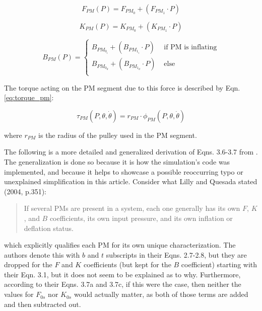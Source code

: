 \documentclass[conference]{IEEEtran}
\begin{document}
	\begin{equation}\label{eq:F_pm}
		F_{PM}(P) = F_{PM_{0}} + (F_{PM_{1}} \cdot P)
	\end{equation}
	
	\begin{equation}\label{eq:K_pm}
		K_{PM}(P) = K_{PM_{0}} + (K_{PM_{1}} \cdot P)
	\end{equation}
	
	\begin{equation}\label{eq:B_pm}
		B_{PM}(P) = \left\{
		\begin{aligned}
			B_{PM_{0_{i}}} + (B_{PM_{1_{i}}} \cdot P) & \text{  if PM is inflating} \\
			B_{PM_{0_{d}}} + (B_{PM_{1_{d}}} \cdot P) & \text{  else} \\
		\end{aligned}
		\right.
	\end{equation}

	The torque acting on the \ac{PM} segment due to this force is described by Eqn. \eqref{eq:torque_pm}:

	\begin{equation}\label{eq:torque_pm}
		\tau_{PM}(P, \theta, \dot{\theta}) = r_{PM} \cdot \phi_{PM}(P, \theta, \dot{\theta})
	\end{equation}

	where $r_{PM}$ is the radius of the pulley used in the \ac{PM} segment.

	The following is a more detailed and generalized derivation of Eqns. 3.6-3.7 from \cite{main-article}. The generalization is done so because it is how the simulation's code was implemented, and because it helps to showcase a possible reoccurring typo or unexplained simplification in this article. Consider what Lilly and Quesada stated (2004, p.351):

	\begin{quote}
		If several \acp{PM} are present in a system, each one generally has
		its own $F$, $K$, and $B$ coefficients, its own input pressure, and
		its own inflation or deflation status.
	\end{quote}

	which explicitly qualifies each \ac{PM} for its own unique characterization. The authors denote this with $b$ and $t$ subscripts in their Eqns. 2.7-2.8, but they are dropped for the $F$ and $K$ coefficients (but kept for the $B$ coefficient) starting with their Eqn. 3.1, but it does not seem to be explained as to why. Furthermore, according to their Eqns. 3.7a and 3.7c, if this were the case, then neither the values for $F_{0s}$ nor $K_{0s}$ would actually matter, as both of those terms are added and then subtracted out.
\end{document}
